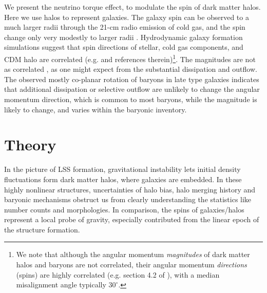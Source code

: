 \documentclass[aps,prd,twocolumn,amsmath,amssymb,amsfont,superscriptaddress,nofootinbib]{revtex4-1}
\begin{document}
We present the neutrino torque effect, to modulate the spin of dark matter halos.
Here we use halos to represent galaxies.
The galaxy spin can be observed to a much larger radii through the 21-cm radio emission of cold gas, and the spin change only very modestly to larger radii \citep{2001ARA&A..39..137S}. 
Hydrodynamic galaxy formation simulations suggest that spin directions of stellar, 
cold gas components, and CDM halo are correlated (e.g. \citep{2010MNRAS.404.1137B,2010MNRAS.405..274H,2011MNRAS.415.2607D,2015ApJ...812...29T} and references therein)\footnote{We
note that although the angular momentum \emph{magnitudes} of dark matter halos and
baryons are not correlated, their angular momentum \emph{directions} (spins) are 
highly correlated (e.g. section 4.2 of \citep{2018arXiv180407306J}), with a median
misalignment angle typically $30^\circ$.}.
The magnitudes are not as correlated \citep{2018arXiv180407306J}, as one might expect from the
substantial dissipation and outflow.
The observed mostly co-planar rotation of baryons in late type galaxies indicates that additional dissipation or selective outflow are unlikely to change the angular momentum direction,
which is common to most baryons, while the magnitude is likely to change, and varies within the baryonic inventory.


\section{Theory}\label{sec.theory}
In the picture of LSS formation, gravitational instability lets initial density fluctuations form dark matter halos, where galaxies are embedded.
In these highly nonlinear structures, uncertainties of halo bias, 
halo merging history and baryonic mechanisms obstruct us from clearly 
understanding the statistics like number counts and morphologies.
In comparison, the spins of galaxies/halos represent a local probe of gravity, 
especially contributed from the linear epoch of the structure formation. 
\end{document}
